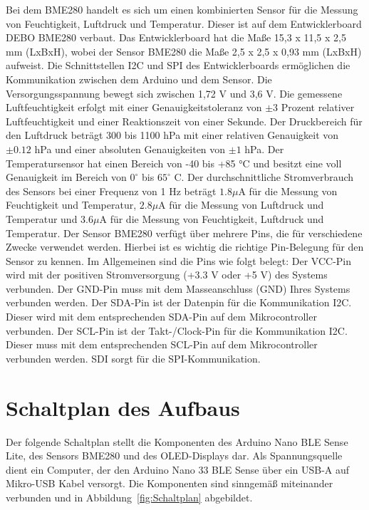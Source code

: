Bei dem BME280 handelt es sich um einen kombinierten Sensor für die Messung von Feuchtigkeit, Luftdruck und Temperatur. Dieser ist auf dem Entwicklerboard DEBO BME280 verbaut. Das Entwicklerboard hat die Maße 15,3 x 11,5 x 2,5 mm (LxBxH), wobei der Sensor BME280 die Maße 2,5 x 2,5 x 0,93 mm (LxBxH) aufweist. Die Schnittstellen I2C und SPI des Entwicklerboards ermöglichen die Kommunikation zwischen dem Arduino und dem Sensor. Die Versorgungsspannung bewegt sich zwischen 1,72 V und 3,6 V. Die gemessene Luftfeuchtigkeit erfolgt mit einer Genauigkeitstoleranz von $\pm 3$ Prozent relativer Luftfeuchtigkeit und einer Reaktionszeit von einer Sekunde. Der Druckbereich für den Luftdruck beträgt 300 bis 1100 hPa mit einer relativen Genauigkeit von $\pm 0.12$ hPa und einer absoluten Genauigkeiten von $\pm 1$ hPa. Der Temperatursensor hat einen Bereich von -40 bis +85 °C und besitzt eine voll Genauigkeit im Bereich von $0^\circ$ bis $65^\circ$ C. Der durchschnittliche Stromverbrauch des Sensors bei einer Frequenz von 1 Hz beträgt $1.8 \mu$A für die Messung von Feuchtigkeit und Temperatur, $2.8\mu$A für die Messung von Luftdruck und Temperatur und $3.6\mu$A für die Messung von Feuchtigkeit, Luftdruck und Temperatur. Der Sensor BME280 verfügt über mehrere Pins, die für verschiedene Zwecke verwendet werden. Hierbei ist es wichtig die richtige Pin-Belegung für den Sensor zu kennen. Im Allgemeinen sind die Pins wie folgt belegt: Der VCC-Pin wird mit der positiven Stromversorgung (+3.3 V oder +5 V) des Systems verbunden. Der GND-Pin muss mit dem Masseanschluss (GND) Ihres Systems verbunden werden. Der SDA-Pin ist der Datenpin für die Kommunikation I2C. Dieser wird mit dem entsprechenden SDA-Pin auf dem Mikrocontroller verbunden. Der SCL-Pin ist der Takt-/Clock-Pin für die Kommunikation I2C. Dieser muss mit dem entsprechenden SCL-Pin auf dem Mikrocontroller verbunden werden. SDI sorgt für die SPI-Kommunikation. \cite{Bosch:2015,Bosch:2021}


\section{Schaltplan des Aufbaus}

Der folgende Schaltplan stellt die Komponenten des Arduino Nano BLE Sense Lite, des Sensors BME280 und des OLED-Displays dar. Als Spannungsquelle dient ein Computer, der den Arduino Nano 33 BLE Sense über ein USB-A auf Mikro-USB Kabel versorgt. Die Komponenten sind sinngemäß miteinander verbunden und in Abbildung~\ref{fig:Schaltplan} abgebildet.

